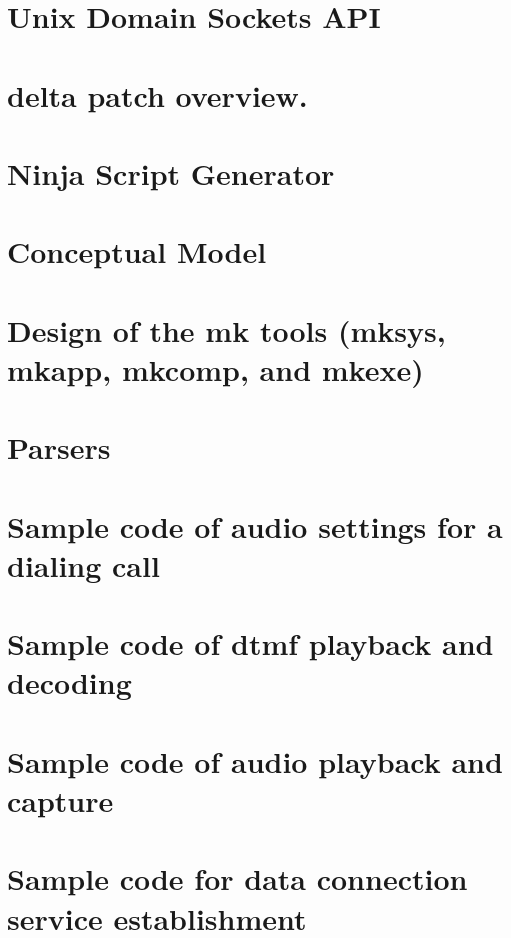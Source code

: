 \documentclass[twoside]{book}
\newcommand{\+}{\discretionary{\mbox{\scriptsize$\hookleftarrow$}}{}{}}
\begin{document}
\chapter{Unix Domain Sockets A\+PI}
\label{c_unixSockets}
\hypertarget{c_unixSockets}{}

\chapter{delta patch overview.}
\label{Delta_Patch}
\hypertarget{Delta_Patch}{}

\chapter{Ninja Script Generator}
\label{mkTools_NinjaScriptGenerator}
\hypertarget{mkTools_NinjaScriptGenerator}{}

\chapter{Conceptual Model}
\label{mkTools_ConceptualModel}
\hypertarget{mkTools_ConceptualModel}{}

\chapter{Design of the mk tools (mksys, mkapp, mkcomp, and mkexe)}
\label{mkToolsDesign}
\hypertarget{mkToolsDesign}{}

\chapter{Parsers}
\label{mkTools_parsers}
\hypertarget{mkTools_parsers}{}

\chapter{Sample code of audio settings for a dialing call}
\label{c_audioMcc}
\hypertarget{c_audioMcc}{}

\chapter{Sample code of dtmf playback and decoding}
\label{c_audiodtmf}
\hypertarget{c_audiodtmf}{}

\chapter{Sample code of audio playback and capture}
\label{c_audioCapturePlayback}
\hypertarget{c_audioCapturePlayback}{}

\chapter{Sample code for data connection service establishment}
\label{c_dataConnectionServiceSample}
\hypertarget{c_dataConnectionServiceSample}{}

\end{document}
